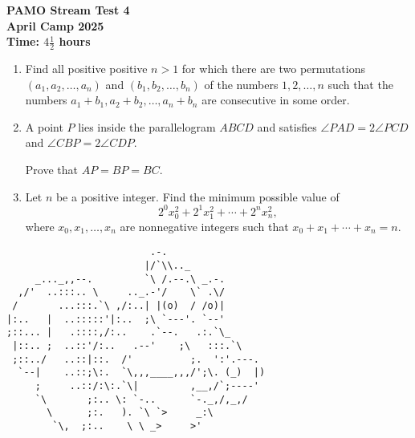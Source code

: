 \documentclass[12pt]{article}
\begin{document}
\thispagestyle{empty}

\begin{center}
  \bfseries
  \Large PAMO Stream Test 4
  \\ \bigskip
  \large April Camp 2025
  \\ \bigskip
  Time: $4\frac{1}{2}$ hours
\end{center}

\bigskip\bigskip
\begin{enumerate}[leftmargin=0pt,itemsep=\bigskipamount]

\item Find all positive positive $n>1$ for which there are two permutations $(a_1,a_2,\dotsc,a_n)$ and $(b_1,b_2,\dotsc,b_n)$ of the numbers $1,2,\dotsc,n$ such that the numbers $a_1+b_1, a_2+b_2, \dotsc, a_n+b_n$ are consecutive in some order.

\item A point $P$ lies inside the parallelogram $ABCD$ and satisfies $\angle PAD = 2\angle PCD$ and $\angle CBP = 2\angle CDP$.

\vspace{0.2cm}
Prove that $AP=BP=BC$.

\item Let $n$ be a positive integer.
Find the minimum possible value of
\[2^0x_0^2 + 2^1x_1^2 + \dotsb + 2^{n}x_{n}^2,\]
where $x_0,x_1,\dotsc,x_{n}$ are nonnegative integers such that $x_0 + x_1 + \dotsb + x_{n} = n$.

\end{enumerate}


\vfill
\centering
\scriptsize %
\begin{BVerbatim}
                         .-.
                        |/`\\.._
     _..._,,--.         `\ /.--.\ _.-. 
  ,/'  ..:::.. \     .._.-'/    \` .\/ 
 /       ...:::.`\ ,/:..| |(o)  / /o)|
|:..   |  ..:::::'|:..  ;\ `---'. `--'
;::... |   .::::,/:..    .`--.   .:.`\_
 |::.. ;  ..::'/:..   .--'    ;\   :::.`\
 ;::../   ..::|::.  /'          ;.  ':'.---.
  `--|    ..::;\:.  `\,,,____,,,/';\. (_)  |)
     ;     ..::/:\:.`\|         ,__,/`;----'
     `\       ;:.. \: `-..      `-._,/,_,/
       \      ;:.   ). `\ `>     _:\
        `\,  ;:..    \ \ _>     >'
\end{BVerbatim}
\end{document}
